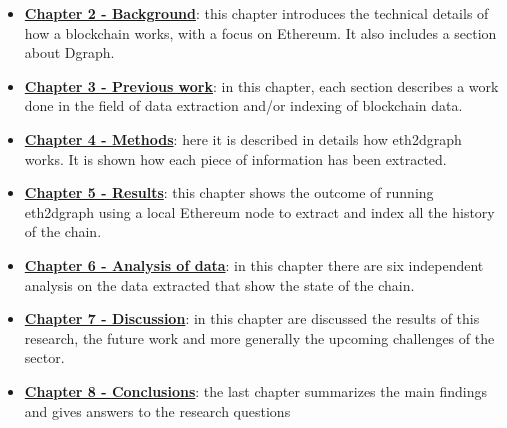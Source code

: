 \begin{itemize}
    \item \hyperref[chapter-2]{\textbf{Chapter 2 - Background}}: this chapter introduces the technical details of how a blockchain works, with a focus on Ethereum. It also includes a section about Dgraph. 
    \item \hyperref[chapter-3]{\textbf{Chapter 3 - Previous work}}: in this chapter, each section describes a work done in the field of data extraction and/or indexing of blockchain data.
    \item \hyperref[chapter-4]{\textbf{Chapter 4 - Methods}}: here it is described in details how eth2dgraph works. It is shown how each piece of information has been extracted.
    \item \hyperref[chapter-5]{\textbf{Chapter 5 - Results}}: this chapter shows the outcome of running eth2dgraph using a local Ethereum node to extract and index all the history of the chain.  
    \item \hyperref[chapter-analysis]{\textbf{Chapter 6 - Analysis of data}}: in this chapter there are six independent analysis on the data extracted that show the state of the chain.
    \item \hyperref[chapter-discussion]{\textbf{Chapter 7 - Discussion}}: in this chapter are discussed the results of this research, the future work and more generally the upcoming challenges of the sector.
    \item \hyperref[chapter-conclusions]{\textbf{Chapter 8 - Conclusions}}: the last chapter summarizes the main findings and gives answers to the research questions
\end{itemize}

